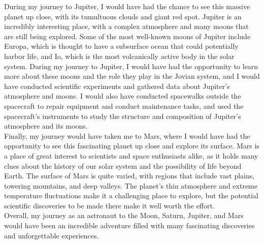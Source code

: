 During my journey to Jupiter, I would have had the chance to see this massive planet up close, with its tumultuous clouds and giant red spot. Jupiter is an incredibly interesting place, with a complex atmosphere and many moons that are still being explored. Some of the most well-known moons of Jupiter include Europa, which is thought to have a subsurface ocean that could potentially harbor life, and Io, which is the most volcanically active body in the solar system. During my journey to Jupiter, I would have had the opportunity to learn more about these moons and the role they play in the Jovian system, and I would have conducted scientific experiments and gathered data about Jupiter's atmosphere and moons. I would also have conducted spacewalks outside the spacecraft to repair equipment and conduct maintenance tasks, and used the spacecraft's instruments to study the structure and composition of Jupiter's atmosphere and its moons. \\


Finally, my journey would have taken me to Mars, where I would have had the opportunity to see this fascinating planet up close and explore its surface. Mars is a place of great interest to scientists and space enthusiasts alike, as it holds many clues about the history of our solar system and the possibility of life beyond Earth. The surface of Mars is quite varied, with regions that include vast plains, towering mountains, and deep valleys. The planet's thin atmosphere and extreme temperature fluctuations make it a challenging place to explore, but the potential scientific discoveries to be made there make it well worth the effort. \\


Overall, my journey as an astronaut to the Moon, Saturn, Jupiter, and Mars would have been an incredible adventure filled with many fascinating discoveries and unforgettable experiences.
